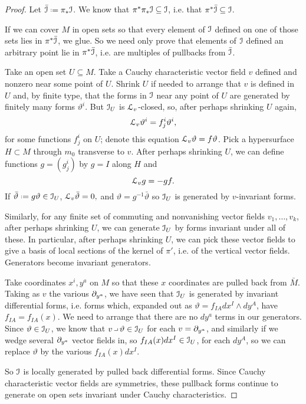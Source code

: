 \begin{proof}
Let \(\bar\II\defeq\pi_*\II\).
We know that \(\pi^*\pi_*\mathcal{I}\subseteq\mathcal{I}\), i.e. that \(\pi^*\bar{\mathcal{I}}\subseteq\mathcal{I}\).

If we can cover \(M\) in open sets so that every element of \(\mathcal{I}\) defined on one of those sets lies in \(\pi^*\bar{\mathcal{I}}\), we glue.
So we need only prove that elements of \(\mathcal{I}\) defined an arbitrary point lie in \(\pi^*\bar{\mathcal{I}}\), i.e. are multiples of pullbacks from \(\bar{\mathcal{I}}\).

Take an open set \(U\subseteq M\).
Take a Cauchy characteristic vector field \(v\) defined and nonzero near some point of \(U\).
Shrink \(U\) if needed to  arrange that \(v\) is defined in \(U\) and, 
by finite type, that the forms in \(\mathcal{I}\) near any point of \(U\) are generated by finitely many forms \(\vartheta^i\).
But \(\mathcal{I}_U\) is \(\EuScript L_v\)-closed, so, after perhaps shrinking \(U\) again,
\[
\EuScript L_v \vartheta^i = f^i_j \vartheta^i,
\]
for some functions \(f^i_j\) on \(U\); denote this equation \(\EuScript L_v \vartheta=f\vartheta\).
Pick a hypersurface \(H \subset M\) through \(m_0\) transverse to \(v\).
After perhaps shrinking \(U\), we can define functions \(g=(g^i_j)\) by \(g=I\) along \(H\) and 
\[
\EuScript L_v g = -gf.
\]
If \(\bar\vartheta\defeq g\vartheta\in\II_U\),
\(
\EuScript L_v \bar\vartheta=0,
\)
and \(\vartheta=g^{-1}\bar\vartheta\) so \(\mathcal{I}_U\) is generated by \(v\)-invariant forms.

Similarly, for any finite set of commuting and nonvanishing vector fields \(v_1,\dots,v_k\), after perhaps shrinking \(U\), we can generate \(\mathcal{I}_U\) by forms invariant under all of these.
In particular, after perhaps shrinking \(U\), we can pick these vector fields to give a basis of local sections of the kernel of \(\pi'\), i.e. of the vertical vector fields.
Generators become invariant generators.

Take coordinates \(x^i,y^a\) on \(M\) so that these \(x\) coordinates are pulled back from \(\bar{M}\).
Taking as \(v\) the various \(\partial_{y^a}\), we have seen that \(\mathcal{I}_U\) is generated by invariant differential forms, i.e. forms which, expanded out as \(\vartheta = f_{IA} dx^I \wedge dy^A\), have \(f_{IA} = f_{IA}(x)\).
We need to arrange that there are no \(dy^a\) terms in our generators.
Since \(\vartheta \in \mathcal{I}_U\), we know that \(v \hook \vartheta \in \II_U\) for each \(v=\partial_{y^a}\), and similarly if we wedge several \(\partial_{y^a}\) vector fields in, so \(f_{IA}(x) dx^I \in \mathcal{I}_U\), for each \(dy^A\), so we can replace \(\vartheta\) by the various \(f_{IA}(x) dx^I\).

So \(\mathcal{I}\) is locally generated by pulled back differential forms.
Since Cauchy characteristic vector fields are symmetries, these pullback forms continue to generate on open sets invariant under Cauchy characteristics.
\end{proof}
